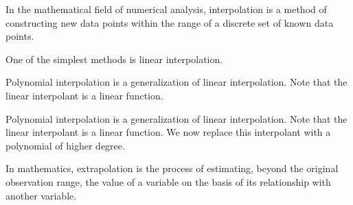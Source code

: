 \documentclass[12pt, a4paper]{article}
\begin{document}
In the mathematical field of numerical analysis, interpolation is a method of constructing new data points within the range of a discrete set of known data points.

\newpage
One of the simplest methods is linear interpolation.

Polynomial interpolation is a generalization of linear interpolation. Note that the linear interpolant is a linear function.

\newpage

Polynomial interpolation is a generalization of linear interpolation. Note that the linear interpolant is a linear function. We now replace this interpolant with a polynomial of higher degree.

In mathematics, extrapolation is the process of estimating, beyond the original observation range, the value of a variable on the basis of its relationship with another variable.

\printindex
\end{document}
